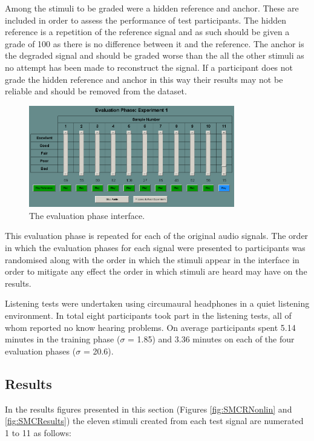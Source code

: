 			Among the stimuli to be graded were a hidden reference and anchor. These are included in order to
			assess the performance of test participants. The hidden reference is a repetition of the reference
			signal and as such should be given a grade of 100 as there is no difference between it and the
			reference. The anchor is the degraded signal and should be graded worse than the all the other
			stimuli as no attempt has been made to reconstruct the signal. If a participant does not grade the
			hidden reference and anchor in this way their results may not be reliable and should be removed
			from the dataset.

			\begin{figure}[h!]
				\centering
				\includegraphics[width=0.8\textwidth]{chapter7/Images/MushraEvaluation.png}
				\caption{The evaluation phase interface.}
				\label{fig:MushraEvaluation}
			\end{figure}

			This evaluation phase is repeated for each of the original audio signals. The order in which the
			evaluation phases for each signal were presented to participants was randomised along with the
			order in which the stimuli appear in the interface in order to mitigate any effect the order in
			which stimuli are heard may have on the results.

			Listening tests were undertaken using circumaural headphones in a quiet listening environment. In
			total eight participants took part in the listening tests, all of whom reported no know hearing
			problems. On average participants spent 5.14 minutes in the training phase ($\sigma$ = 1.85) and
			3.36 minutes on each of the four evaluation phases ($\sigma$ = 20.6).

	\subsection{Results}
	\label{sec:PerceptualExperiments-Reconstruction-Results}
		In the results figures presented in this section (Figures \ref{fig:SMCRNonlin} and \ref{fig:SMCResults})
		the eleven stimuli created from each test signal are numerated 1 to 11 as follows:

